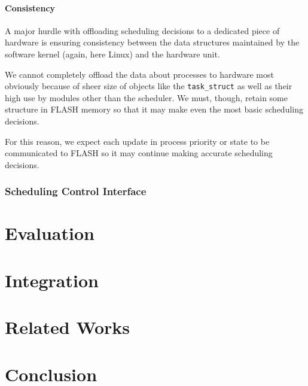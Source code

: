 \documentclass{sig-alternate-10pt}
\newcommand{\ttt}{\texttt}
\begin{document}
\paragraph{Consistency} A major hurdle with offloading scheduling decisions
to a dedicated piece of hardware is ensuring consistency between the data
structures maintained by the software kernel (again, here Linux) and the
hardware unit.

We cannot completely offload the data about processes to hardware most
obviously because of sheer size of objects like the \ttt{task\_struct} as
well as their high use by modules other than the scheduler.  We must,
though, retain some structure in FLASH memory so that it may make even the
most basic scheduling decisions.

For this reason, we expect each update in process priority or state to be
communicated to FLASH so it may continue making accurate scheduling
decisions.

\subsubsection{Scheduling Control Interface}

\section{Evaluation}
\lipsum[1]

\section{Integration}
\lipsum[1]

\section{Related Works}
\lipsum[1]

\section{Conclusion}
\lipsum[1]

\nocite{*}
{\small
	
	
}
\end{document}

